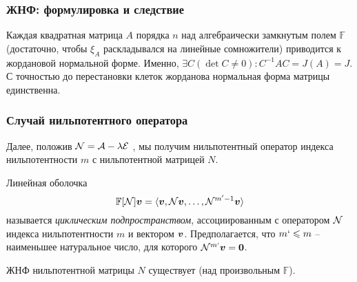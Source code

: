

\subsubsection{ЖНФ: формулировка и следствие}
\begin{to_thr} 
    Каждая квадратная матрица $A$ порядка $n$ над алгебраически замкнутым полем $\mathbb{F}$ (достаточно, чтобы $\xi_{A}$ раскладывался на линейные сомножители) приводится к жордановой нормальной форме. Именно, $\exists C (\det C \neq 0) \colon C^{-1} A C = J(A) = J$. С точностью до перестановки клеток жорданова нормальная форма матрицы единственна. 
\end{to_thr}


\subsubsection{Случай нильпотентного оператора}

Далее, положив $\N = \A - \lambda \mathcal E$ , мы получим нильпотентный оператор индекса нильпотентности $m$ с нильпотентной матрицей $N$.

\begin{to_def} 
    Линейная оболочка 
$$
    \mathbb{F}[\N] \vc{v} = \langle \vc{v}, \N \vc{v}, \ldots, \N^{m'-1} \vc{v}\rangle
$$
называется \textit{циклическим подпространством}, ассоциированным с оператором $\N$ индекса нильпотентности $m$ и вектором $\vc{v}$. Предполагается, что $m` \leq m$ -- наименьшее натуральное число, для которого $\N^{m`} \vc{v} = \vc{0}$.
\end{to_def}

\begin{to_thr} 
    ЖНФ нильпотентной матрицы $N$ существует (над произвольным $\mathbb{F}$).
\end{to_thr}

